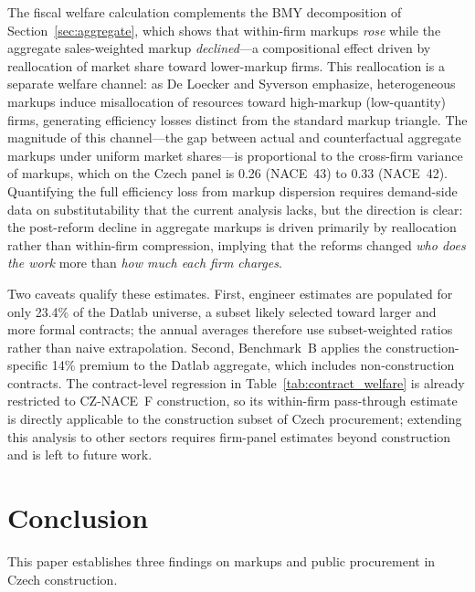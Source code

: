 \documentclass[11pt]{article}
\begin{document}
The fiscal welfare calculation complements the BMY decomposition of Section~\ref{sec:aggregate}, which shows that within-firm markups \emph{rose} while the aggregate sales-weighted markup \emph{declined}---a compositional effect driven by reallocation of market share toward lower-markup firms. This reallocation is a separate welfare channel: as De Loecker and Syverson \cite{DLS2021} emphasize, heterogeneous markups induce misallocation of resources toward high-markup (low-quantity) firms, generating efficiency losses distinct from the standard markup triangle. The magnitude of this channel---the gap between actual and counterfactual aggregate markups under uniform market shares---is proportional to the cross-firm variance of markups, which on the Czech panel is 0.26 (NACE~43) to 0.33 (NACE~42). Quantifying the full efficiency loss from markup dispersion requires demand-side data on substitutability that the current analysis lacks, but the direction is clear: the post-reform decline in aggregate markups is driven primarily by reallocation rather than within-firm compression, implying that the reforms changed \emph{who does the work} more than \emph{how much each firm charges}.

Two caveats qualify these estimates. First, engineer estimates are populated for only 23.4\% of the Datlab universe, a subset likely selected toward larger and more formal contracts; the annual averages therefore use subset-weighted ratios rather than naive extrapolation. Second, Benchmark~B applies the construction-specific 14\% premium to the Datlab aggregate, which includes non-construction contracts. The contract-level regression in Table~\ref{tab:contract_welfare} is already restricted to CZ-NACE~F construction, so its within-firm pass-through estimate is directly applicable to the construction subset of Czech procurement; extending this analysis to other sectors requires firm-panel estimates beyond construction and is left to future work.


\section{Conclusion}\label{sec:conclusion}

This paper establishes three findings on markups and public procurement in Czech construction.
\end{document}

